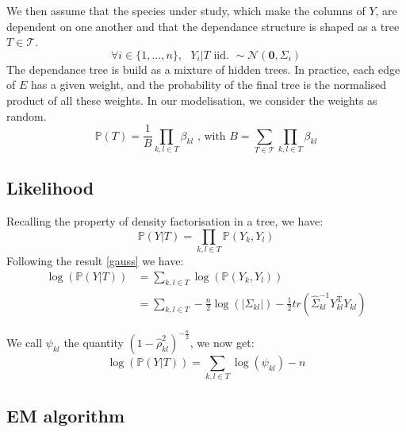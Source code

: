 \documentclass[a4paper,11pt]{article}
\begin{document}
  We then assume that the species under study, which make the columns of $Y$, are dependent on one another and that the dependance structure
  is shaped as a tree $T\in\mathcal{T}$.\\
  \[\forall i\in\{1,...,n\},\text{  }Y_i|T \text{ iid. } \sim \mathcal{N}(\mathbf{0},\Sigma_i)\]
  The dependance tree is build as a mixture of hidden trees. In practice, each edge of $E$ has a given weight, and the probability of the final
  tree is the normalised product of all these weights. In our modelisation, we consider the weights as random.
  \[ \mathds{P}(T) = \frac{1}{B}\prod_{k,l\in T} \beta_{kl} \text{ , with } B = \sum_{T\in\mathcal{T}} \prod_{k,l\in T} \beta_{kl} \]
  
  \subsection{Likelihood}
  Recalling the property of density factorisation in a tree, we have:
  \[\mathds{P}(Y|T) = \prod_{k,l\in T}\mathds{P}(Y_k,Y_l)\]
  Following the result \ref{gauss} we have:
  \begin{align*}
   \log(\mathds{P}(Y|T)) &= \sum_{k,l\in T} \log(\mathds{P}(Y_k,Y_l))\\
   &= \sum_{k,l\in T} -\frac{n}{2} \log (|\Sigma_{kl}|) - \frac{1}{2}tr(\hat{\Sigma}_{kl}^{-1} Y_{kl}^{\text{T}}Y_{kl})
  \end{align*}

We call $\psi_{kl}$ the quantity $(1-\hat{\rho}_{kl}^2)^{-\frac{n}{2}}$, we now get:
\[ \log(\mathds{P}(Y|T))=\sum_{k,l\in T} \log(\psi_{kl}) -n\]
  \subsection{EM algorithm}
\end{document}
